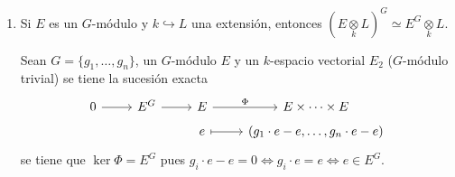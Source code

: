 \begin{enumerate}
\begin{dem}
        $\Leftarrow)$ Dado $z\in \Delta^H$, construimos $f_z : \modulo{G}{H} \longrightarrow \Delta \, / \, f_z([g])\coloneqq g\cdot z$. Veamos que:
        \begin{enumerate}
            \item Est\'a bien definida, es decir, no depende del representante escogido. Sea $g'$ otro representante tal que $[g']=[g]$, $g' \in gH \equiv g'=g\cdot h, \, h \in H$. 
            $$f([g']) = g'\cdot z = (g\cdot h)\cdot z = g\cdot (h\cdot z)=g\cdot z = f([g])$$
            por ser $z\in \Delta^H$, $h\cdot z = z$. 
            \item Es morfismo de $G$-conjuntos, es decir, preserva la acci\'on de $G$. $\forall \, g' \in G, \, [g] \in \modulo{G}{H}$, 
            $$f(g'\cdot [g]) = f([g'\cdot g]) = (g'g)\cdot z \qquad g'\cdot f([g]) = g'\cdot (g\cdot z) = (g'g)\cdot z$$
            luego $f(g'\cdot [g])  = g'\cdot f([g])$ como quer\'iamos probar.
            \item Es isomorfismo, viendo que $\Phi \circ \Phi^{-1}=Id$ y $\Phi^{-1} \circ \Phi=Id$. 
            
            $f \longmapsto f([1])  \longmapsto f_z\overset{?}{=} f$. $f_z([g]) = g \cdot z = g\cdot f([1]) = f(g\cdot [1]) = f([g]) \Rightarrow f_z=f$. 
            
            $z  \longmapsto f_z  \longmapsto f_z([1]) \overset{?}{=}  z$. $f_z([1]) = 1\cdot z = z$. 
        \end{enumerate}
    \end{dem}
    \item Si $E$ es un $G$-m\'odulo y $k \hookrightarrow L$ una extensi\'on, entonces $(E \underset{k}{\otimes} L)^G \simeq E^G \underset{k}{\otimes} L$.
    \begin{dem}
        Sean $G = \{g_1, \ldots, g_n\}$, un $G$-m\'odulo $E$ y un $k$-espacio vectorial $E_2$ ($G$-m\'odulo trivial) se tiene la sucesi\'on exacta
        $$\bt 0 \rar & E^G \rar & E \rar{\Phi} & E \times \cdots \times E \\[-5mm] & & e \rarmaps & (g_1\cdot e -e, \ldots, g_n\cdot e -e)  \et$$
        se tiene que $\ker \Phi = E^G$ pues $g_i \cdot e - e = 0\iff g_i \cdot e= e \iff e \in E^G$.


\end{dem}
\end{enumerate}
